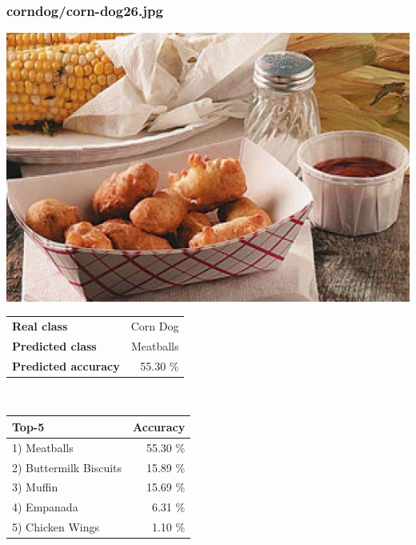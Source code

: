 \subsubsection{corn\textunderscore dog/corn-dog26.jpg}

\begin{minipage}[t]{0.4\textwidth}
	\vspace{0pt}
	\includegraphics[width=\linewidth]{images/evaluation-images/corn_dog/corn-dog26.jpg}
\end{minipage}
\hfill
\begin{minipage}[t]{0.5\textwidth}
	\vspace{0pt}\raggedright
	\begin{tabularx}{\textwidth}{X r}
		\small \textbf{Real class} & \small Corn Dog\\
		\small \textbf{Predicted class} & \small Meatballs\\
		\small \textbf{Predicted accuracy} & \small 55.30 \%
    \end{tabularx}\\
    
    \vspace{6pt}
	\begin{tabularx}{\textwidth}{X r}
        \small \textbf{Top-5} & \small \textbf{Accuracy} \\
        \hline
		\small 1) Meatballs & \small 55.30 \%\\\small 2) Buttermilk Biscuits & \small 15.89 \%\\\small 3) Muffin & \small 15.69 \%\\\small 4) Empanada & \small 6.31 \%\\\small 5) Chicken Wings & \small 1.10 \%
    \end{tabularx}
\end{minipage}
    
